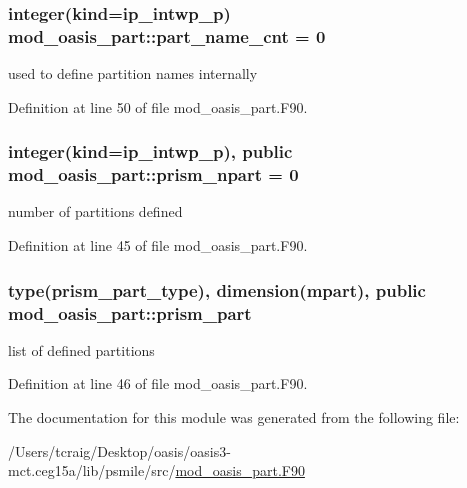 \hypertarget{classmod__oasis__part_a8cee930f023feb7bcad4a0cab0b490a1}{
\subsubsection[{part\+\_\+name\+\_\+cnt}]{\setlength{\rightskip}{0pt plus 5cm}integer(kind=ip\+\_\+intwp\+\_\+p) mod\+\_\+oasis\+\_\+part\+::part\+\_\+name\+\_\+cnt = 0\hspace{0.3cm}{\ttfamily [private]}}}\label{classmod__oasis__part_a8cee930f023feb7bcad4a0cab0b490a1}


used to define partition names internally 



Definition at line 50 of file mod\+\_\+oasis\+\_\+part.\+F90.

\hypertarget{classmod__oasis__part_ac8340e63b159a9786ad8fffabd1d47f8}{
\subsubsection[{prism\+\_\+npart}]{\setlength{\rightskip}{0pt plus 5cm}integer(kind=ip\+\_\+intwp\+\_\+p), public mod\+\_\+oasis\+\_\+part\+::prism\+\_\+npart = 0}}\label{classmod__oasis__part_ac8340e63b159a9786ad8fffabd1d47f8}


number of partitions defined 



Definition at line 45 of file mod\+\_\+oasis\+\_\+part.\+F90.

\hypertarget{classmod__oasis__part_a326ce52f630ba7e71905af864a6cb2dc}{
\subsubsection[{prism\+\_\+part}]{\setlength{\rightskip}{0pt plus 5cm}type({\bf prism\+\_\+part\+\_\+type}), dimension({\bf mpart}), public mod\+\_\+oasis\+\_\+part\+::prism\+\_\+part}}\label{classmod__oasis__part_a326ce52f630ba7e71905af864a6cb2dc}


list of defined partitions 



Definition at line 46 of file mod\+\_\+oasis\+\_\+part.\+F90.



The documentation for this module was generated from the following file\+:\begin{DoxyCompactItemize}
\item 
/\+Users/tcraig/\+Desktop/oasis/oasis3-\/mct.\+ceg15a/lib/psmile/src/\hyperlink{mod__oasis__part_8_f90}{mod\+\_\+oasis\+\_\+part.\+F90}\end{DoxyCompactItemize}
